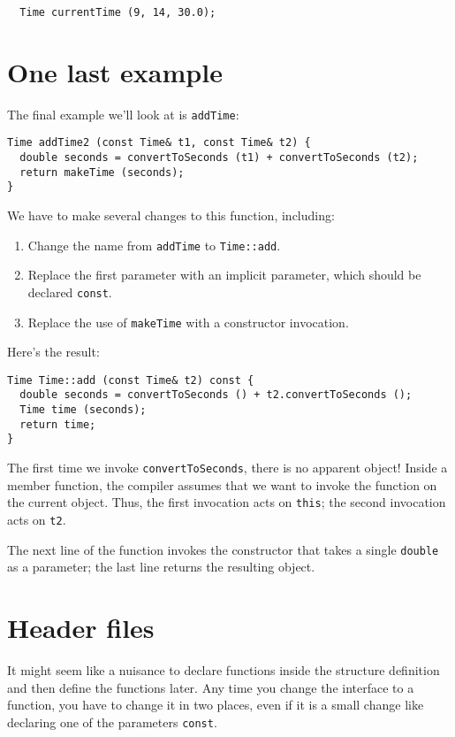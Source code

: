 {\begin{verbatim}
  Time currentTime (9, 14, 30.0);
\end{verbatim}

\section {One last example}

The final example we'll look at is {\tt addTime}:

\begin{verbatim}
Time addTime2 (const Time& t1, const Time& t2) {
  double seconds = convertToSeconds (t1) + convertToSeconds (t2);
  return makeTime (seconds);
}
\end{verbatim}
%
We have to make several changes to this function, including:

\begin{enumerate}

\item Change the name from {\tt addTime} to {\tt Time::add}.

\item Replace the first parameter with an implicit parameter,
which should be declared {\tt const}.

\item Replace the use of {\tt makeTime} with a constructor
invocation.

\end{enumerate}
%
Here's the result:

\begin{verbatim}
Time Time::add (const Time& t2) const {
  double seconds = convertToSeconds () + t2.convertToSeconds ();
  Time time (seconds);
  return time;
}
\end{verbatim}
%
The first time we invoke {\tt convertToSeconds},
there is no apparent object!  Inside a member function, the compiler
assumes that we want to invoke the function on the current object.
Thus, the first invocation acts on {\tt this}; the second
invocation acts on {\tt t2}.

The next line of the function invokes the constructor that
takes a single {\tt double} as a parameter; the last line returns
the resulting object.

\section {Header files}

It might seem like a nuisance to declare functions inside
the structure definition and then define the functions later.
Any time you change the interface to a function, you have
to change it in two places, even if it is a small change
like declaring one of the parameters {\tt const}.

}
